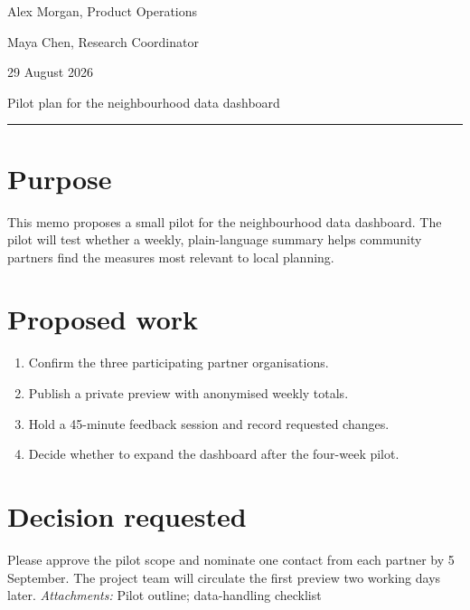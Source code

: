 \documentclass[11pt]{article}
\newcommand{\memofield}[2]{\noindent\makebox[24mm][l]{\sffamily\bfseries\color{memoteal}#1}#2\par}
\begin{document}
\memofield{To:}{Alex Morgan, Product Operations}
\memofield{From:}{Maya Chen, Research Coordinator}
\memofield{Date:}{29 August 2026}
\memofield{Subject:}{Pilot plan for the neighbourhood data dashboard}
\vspace{3mm}\noindent\color{memoteal}\rule{\linewidth}{1pt}\color{black}
\section*{Purpose}
This memo proposes a small pilot for the neighbourhood data dashboard. The
pilot will test whether a weekly, plain-language summary helps community
partners find the measures most relevant to local planning.
\section*{Proposed work}
\begin{enumerate}[leftmargin=*,itemsep=2pt]
  \item Confirm the three participating partner organisations.
  \item Publish a private preview with anonymised weekly totals.
  \item Hold a 45-minute feedback session and record requested changes.
  \item Decide whether to expand the dashboard after the four-week pilot.
\end{enumerate}
\section*{Decision requested}
Please approve the pilot scope and nominate one contact from each partner by
5 September. The project team will circulate the first preview two working
days later.
\vfill\noindent\textit{Attachments:} Pilot outline; data-handling checklist
\end{document}
